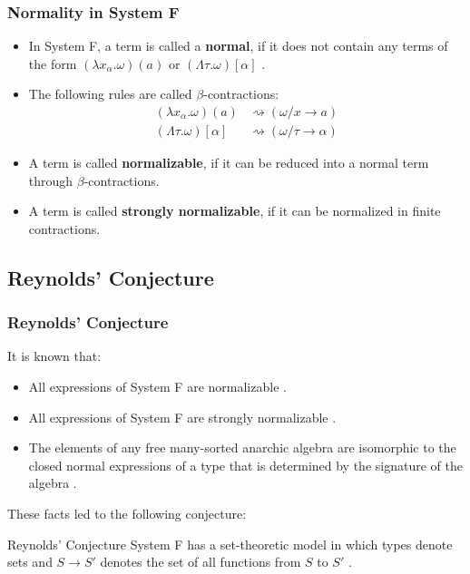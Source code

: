 \begin{frame}[fragile]
    \frametitle{Normality in System F}
  
    \begin{itemize}
        \item In System F, a term is called a \textbf{normal}, if it does not contain any terms of the form $(\lambda x_\alpha. \omega)(a)$ or $(\Lambda \tau. \omega)[\alpha]$  \cite{capretta_valentini_1999}.
        \item The following rules are called $\beta$-contractions:
        \begin{align*}
            (\lambda x_\alpha. \omega)(a) &\rightsquigarrow (\omega / x \rightarrow a) \\
            (\Lambda \tau. \omega)[\alpha] &\rightsquigarrow (\omega / \tau \rightarrow \alpha)
        \end{align*}
        \item A term is called \textbf{normalizable}, if it can be reduced into a normal term through $\beta$-contractions.
        \item A term is called \textbf{strongly normalizable}, if it can be normalized in finite contractions.
    \end{itemize}
\end{frame}

\subsection{Reynolds' Conjecture}

\begin{frame}[fragile]
    \frametitle{Reynolds' Conjecture}
  
    It is known that:
    \begin{itemize}
        \item All expressions of System F are normalizable \cite{girard1972phd}.
        \item All expressions of System F are strongly normalizable \cite{PRAWITZ1971235}.
        \item The elements of any free many-sorted anarchic algebra are isomorphic to the closed normal expressions of a type that is determined by the signature of the algebra \cite{BOHM1985135}.
    \end{itemize}

    These facts led to the following conjecture:
    \begin{block}{Reynolds' Conjecture}
		System F has a set-theoretic model in which types denote sets and $S \rightarrow S'$ denotes the set of all functions from $S$ to $S'$ \cite{reynolds1983types}.
	\end{block}
\end{frame}

